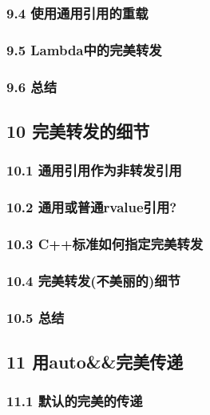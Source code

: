\documentclass[11pt,a4paper,UTF8]{ctexart}
\begin{document}
		\subsubsection{9.4 使用通用引用的重载}		
		
		\subsubsection{9.5 Lambda中的完美转发}
		
		\subsubsection{9.6 总结}
		
	\subsection{10 完美转发的细节}
	
		\subsubsection{10.1 通用引用作为非转发引用}
		
		\subsubsection{10.2 通用或普通rvalue引用?}
		
		\subsubsection{10.3 C++标准如何指定完美转发}
		
		\subsubsection{10.4 完美转发(不美丽的)细节}
		
		\subsubsection{10.5 总结}
		
	\subsection{11 用auto\&\&完美传递}
	
		\subsubsection{11.1 默认的完美的传递}
		
\end{document}
